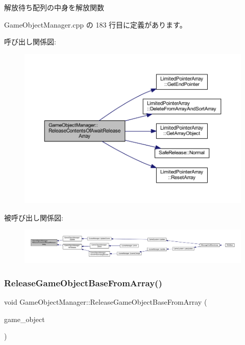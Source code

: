 解放待ち配列の中身を解放関数 



 Game\+Object\+Manager.\+cpp の 183 行目に定義があります。

呼び出し関係図\+:
\nopagebreak
\begin{figure}[H]
\begin{center}
\leavevmode
\includegraphics[width=350pt]{class_game_object_manager_a5a6c1208229decd93c6ef396bce35b3a_cgraph}
\end{center}
\end{figure}
被呼び出し関係図\+:
\nopagebreak
\begin{figure}[H]
\begin{center}
\leavevmode
\includegraphics[width=350pt]{class_game_object_manager_a5a6c1208229decd93c6ef396bce35b3a_icgraph}
\end{center}
\end{figure}
\mbox{\label{class_game_object_manager_a83342c1c358e32f6478ae3428fcb25fa}} 
\subsubsection{\texorpdfstring{Release\+Game\+Object\+Base\+From\+Array()}{ReleaseGameObjectBaseFromArray()}}
{\footnotesize\ttfamily void Game\+Object\+Manager\+::\+Release\+Game\+Object\+Base\+From\+Array (\begin{DoxyParamCaption}\item[{\mbox{\hyperlink{class_game_object_base}{Game\+Object\+Base}} $\ast$}]{game\+\_\+object }\end{DoxyParamCaption})\hspace{0.3cm}{\ttfamily [static]}}



